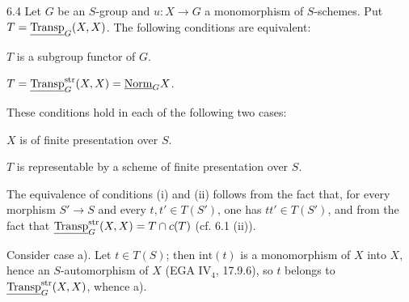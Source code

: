 \begin{proposition}{6.4}\label{VIB.6.4}
Let $G$ be an $S$-group and $u:X\to G$ a monomorphism of $S$-schemes. Put $T=\underline{\operatorname{Transp}}_G(X,X)$. The following conditions are equivalent:
\begin{enumeratei}
\item $T$ is a subgroup functor of $G$.
\item $T=\underline{\operatorname{Transp}}_G^{\mathrm{str}}(X,X)=\underline{\mathrm{Norm}}_GX$.
\end{enumeratei}
These conditions hold in each of the following two cases:
\begin{enumeratea}
\item $X$ is of finite presentation over $S$.
\item $T$ is representable by a scheme of finite presentation over $S$.
\end{enumeratea}
\end{proposition}
The equivalence of conditions (i) and (ii) follows from the fact that, for every morphism $S'\to S$ and every $t,t'\in T(S')$, one has $tt'\in T(S')$, and from the fact that $\underline{\operatorname{Transp}}_G^{\mathrm{str}}(X,X)=T\cap c(T)$ (cf. 6.1 (ii)).

Consider case a). Let $t\in T(S)$; then $\mathrm{int}(t)$ is a monomorphism of $X$ into $X$, hence an $S$-automorphism of $X$ (EGA IV$_4$, 17.9.6), so $t$ belongs to $\underline{\operatorname{Transp}}_G^{\mathrm{str}}(X,X)$, whence a).

